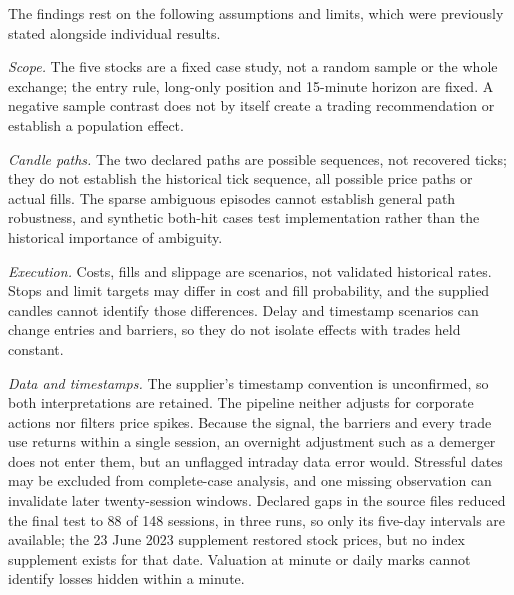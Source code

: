 \documentclass[11pt,a4paper]{article}
\begin{document}
The findings rest on the following assumptions and limits, which were previously stated alongside individual results.

\textit{Scope.} The five stocks are a fixed case study, not a random sample or the whole exchange; the entry rule, long-only position and 15-minute horizon are fixed. A negative sample contrast does not by itself create a trading recommendation or establish a population effect.

\textit{Candle paths.} The two declared paths are possible sequences, not recovered ticks; they do not establish the historical tick sequence, all possible price paths or actual fills. The sparse ambiguous episodes cannot establish general path robustness, and synthetic both-hit cases test implementation rather than the historical importance of ambiguity.

\textit{Execution.} Costs, fills and slippage are scenarios, not validated historical rates. Stops and limit targets may differ in cost and fill probability, and the supplied candles cannot identify those differences. Delay and timestamp scenarios can change entries and barriers, so they do not isolate effects with trades held constant.

\textit{Data and timestamps.} The supplier's timestamp convention is unconfirmed, so both interpretations are retained. The pipeline neither adjusts for corporate actions nor filters price spikes. Because the signal, the barriers and every trade use returns within a single session, an overnight adjustment such as a demerger does not enter them, but an unflagged intraday data error would. Stressful dates may be excluded from complete-case analysis, and one missing observation can invalidate later twenty-session windows. Declared gaps in the source files reduced the final test to 88 of 148 sessions, in three runs, so only its five-day intervals are available; the 23 June 2023 supplement restored stock prices, but no index supplement exists for that date. Valuation at minute or daily marks cannot identify losses hidden within a minute.
\end{document}
